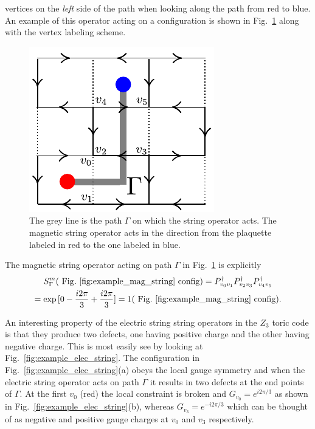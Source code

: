 \documentclass[aps,floatfix,11pt,twocolumn]{revtex4-1}
\begin{document}
            vertices
            on the \textit{left} side of the path when looking along the path from red to blue. 
            An example of this operator acting
            on a configuration is shown in Fig.~\ref{fig:example_mag_string} along with the vertex labeling
            scheme.
            \begin{figure}[htpb]
                \centering
                \includegraphics[width=0.8\linewidth]{example_mag_string.pdf}
                \caption{The grey line is the path $\Gamma$ on which the string operator acts. The magnetic
                    string operator acts in the 
                    direction from the plaquette labeled in red to the one labeled in blue.}
                \label{fig:example_mag_string}
            \end{figure}
            The magnetic string operator acting on path $\Gamma$ in Fig.~\ref{fig:example_mag_string} is
            explicitly
            \begin{multline}
                S^m_{\Gamma} (\mathrm{~Fig.~\ref{fig:example_mag_string}~config})
                = P_{v_0v_1}^\dagger P_{v_2v_3}^\dagger P_{v_4v_5}^\dagger
                \\
                = \exp{[0 - \frac{i2\pi}{3} + \frac{i2\pi}{3} ]} 
                = 1 (\mathrm{~Fig.~\ref{fig:example_mag_string}~config})
                .
            \end{multline}

            An interesting property of the electric string string operators in the $Z_3$ toric code is
            that they produce two defects, one having positive charge and the other having negative
            charge. This is most easily see by looking at Fig.~\ref{fig:example_elec_string}. The
            configuration in Fig.~\ref{fig:example_elec_string}(a) obeys the local gauge symmetry and
            when the electric string operator acts on path $\Gamma$ it results in two defects at the
            end points of $\Gamma$. At the first $v_0$ (red) the local constraint is broken and
            $G_{v_0} = e^{i2\pi /3}$ as shown in Fig.~\ref{fig:example_elec_string}(b), whereas
            $G_{v_3} = e^{-i2\pi /3}$ which can be thought of as negative and positive gauge charges
            at $v_0$ and $v_3$ respectively.
\end{document}
